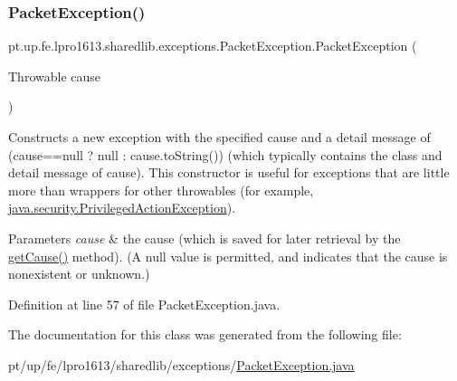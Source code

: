 \subsubsection{\texorpdfstring{Packet\+Exception()}{PacketException()}\hspace{0.1cm}{\footnotesize\ttfamily [4/4]}}
{\footnotesize\ttfamily pt.\+up.\+fe.\+lpro1613.\+sharedlib.\+exceptions.\+Packet\+Exception.\+Packet\+Exception (\begin{DoxyParamCaption}\item[{Throwable}]{cause }\end{DoxyParamCaption})}

Constructs a new exception with the specified cause and a detail message of {\ttfamily (cause==null ? null \+: cause.\+to\+String())} (which typically contains the class and detail message of {\ttfamily cause}). This constructor is useful for exceptions that are little more than wrappers for other throwables (for example, \hyperlink{}{java.\+security.\+Privileged\+Action\+Exception}).


\begin{DoxyParams}{Parameters}
{\em cause} & the cause (which is saved for later retrieval by the \hyperlink{}{get\+Cause()} method). (A {\ttfamily null} value is permitted, and indicates that the cause is nonexistent or unknown.) \\
\hline
\end{DoxyParams}


Definition at line 57 of file Packet\+Exception.\+java.



The documentation for this class was generated from the following file\+:\begin{DoxyCompactItemize}
\item 
pt/up/fe/lpro1613/sharedlib/exceptions/\hyperlink{_packet_exception_8java}{Packet\+Exception.\+java}\end{DoxyCompactItemize}

